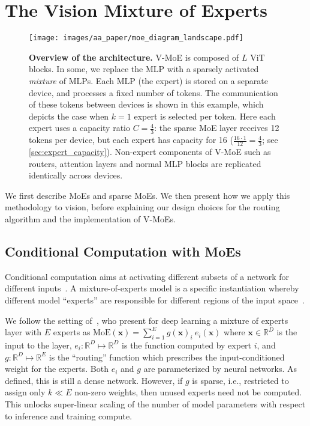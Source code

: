 \documentclass{article}
\newcommand{\abbv}{{V-MoE}}
\begin{document}
 \section{The Vision Mixture of Experts}
\label{sec:model}

\begin{figure}
\centering
\texttt{[image: images/aa\_paper/moe\_diagram\_landscape.pdf]}
\caption{\textbf{Overview of the architecture.} \abbv{} is composed of $L$ ViT blocks. In some, we replace the MLP with a sparsely activated \textit{mixture} of MLPs. Each MLP (the expert) is stored on a separate device, and processes a fixed number of tokens. The communication of these tokens between devices is shown in this example, which depicts the case when $k = 1$ expert is selected per token. 
Here each expert uses a capacity ratio $C = \frac{4}{3}$: the sparse MoE layer receives 12 tokens per device, but each expert has capacity for 16 ($\frac{16 \cdot 1}{12} = \frac{4}{3}$; see \cref{sec:expert_capacity}).
Non-expert components of \abbv{} such as routers, attention layers and normal MLP blocks are replicated identically across devices.}
\label{im:v_moe_architecture}
\end{figure}

We first describe MoEs and sparse MoEs. We then present how we apply this methodology to vision, 
before explaining our design choices for the routing algorithm and the implementation of \abbv{}s.

\subsection{Conditional Computation with MoEs}
Conditional computation aims at activating different subsets of a network for different inputs~\cite{bengio2013deep}.
A mixture-of-experts model is a specific instantiation whereby different model ``experts'' are responsible for different regions of the input space~\cite{jacobs1991adaptive}.

We follow the setting of~\cite{shazeer2017outrageously}, who present for deep learning a mixture of experts layer with $E$ experts as $\mathrm{MoE}(\mathbf{x})= \sum_{i=1}^E g(\mathbf{x})_i \ e_i(\mathbf{x})$ where $\mathbf{x}\in\mathbb{R}^D$ is the input to the layer, 
$e_i: \mathbb{R}^D\mapsto\mathbb{R}^D$ is the function computed by expert $i$, 
and $g: \mathbb{R}^D\mapsto\mathbb{R}^E$ is the ``routing'' function which prescribes the input-conditioned weight for the experts.
Both $e_i$ and $g$ are parameterized by neural networks.
As defined, this is still a dense network.  
However, if $g$ is sparse, i.e., restricted to assign only $k \ll E$ non-zero weights, then unused experts need not be computed.
This unlocks super-linear scaling of the number of model parameters with respect to inference and training compute.
\end{document}
